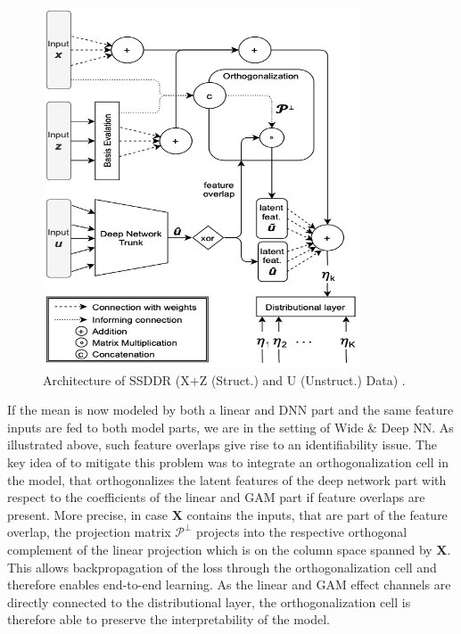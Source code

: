 \documentclass[
]{krantz}
\begin{document}
\begin{figure}

{\centering \includegraphics[width=1\linewidth]{figures/03-02-struc+unstruc-data/SSDDR_Architecture} 

}

\caption{Architecture of SSDDR (X+Z (Struct.) and U (Unstruct.) Data) \citep{SSDDR2020}.}\label{fig:SSDDR}
\end{figure}



If the mean is now modeled by both a linear and DNN part and the same feature inputs are fed to both model parts, we are in the setting of Wide \& Deep NN. As illustrated above, such feature overlaps give rise to an identifiability issue. The key idea of \citet{SSDDR2020} to mitigate this problem was to integrate an orthogonalization cell in the model, that orthogonalizes the latent features of the deep network part with respect to the coefficients of the linear and GAM part if feature overlaps are present. More precise, in case \(\boldsymbol{X}\) contains the inputs, that are part of the feature overlap, the projection matrix \(\boldsymbol{\mathcal{P}^{\perp}}\) projects into the respective orthogonal complement of the linear projection which is on the column space spanned by \(\boldsymbol{X}\). This allows backpropagation of the loss through the orthogonalization cell and therefore enables end-to-end learning. As the linear and GAM effect channels are directly connected to the distributional layer, the orthogonalization cell is therefore able to preserve the interpretability of the model.
\end{document}
